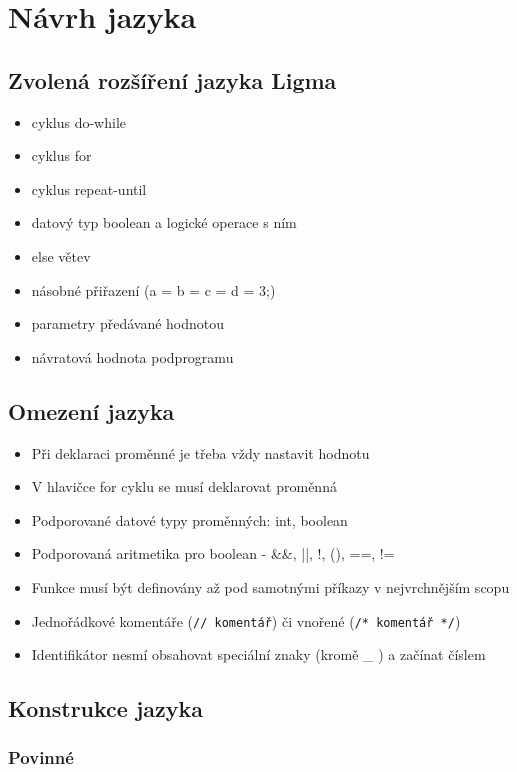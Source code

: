 \documentclass[czech, oth, kiv, he, iso690numb, viewonly]{fasthesis}
\begin{document}
\chapter{Návrh jazyka}

\section{Zvolená rozšíření jazyka Ligma}
\begin{itemize}
    \item cyklus do-while 
    \item cyklus for
    \item cyklus repeat-until
    \item datový typ boolean a logické operace s ním
    \item else větev
    \item násobné přiřazení (a = b = c = d = 3;)
    \item parametry předávané hodnotou
    \item návratová hodnota podprogramu
\end{itemize}

\section{Omezení jazyka}
\begin{itemize}
    \item Při deklaraci proměnné je třeba vždy nastavit hodnotu
    \item V hlavičce for cyklu se musí deklarovat proměnná
    \item Podporované datové typy proměnných: int, boolean
    \item Podporovaná aritmetika pro boolean - \&\&, ||, !, (), ==, !=
    \item Funkce musí být definovány až pod samotnými příkazy v nejvrchnějším scopu
    \item Jednořádkové komentáře (\texttt{// komentář}) či vnořené (\texttt{/* komentář */})
    \item Identifikátor nesmí obsahovat speciální znaky (kromě \_ ) a začínat číslem
\end{itemize}

\section{Konstrukce jazyka}

\subsection{Povinné}
\end{document}
